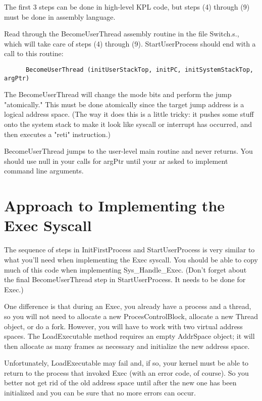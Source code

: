 \documentclass[12pt]{article}
\begin{document}
The first 3 steps can be done in high-level KPL code, but steps (4)
through (9) must be done in assembly language.

Read through the BecomeUserThread assembly routine in the file
Switch.s., which will take care of steps (4) through (9).
StartUserProcess should end with a call to this routine:

\begin{verbatim}
      BecomeUserThread (initUserStackTop, initPC, initSystemStackTop, argPtr)
\end{verbatim}

The BecomeUserThread will change the mode bits and perform the jump
"atomically." This must be done atomically since the target jump
address is a logical address space.  (The way it does this is a little
tricky: it pushes some stuff onto the system stack to make it look
like syscall or interrupt has occurred, and then executes a "reti"
instruction.)

BecomeUserThread jumps to the user-level main routine and never returns.
You should use null in your calls for argPtr until your ar asked to
implement command line arguments.


\section{Approach to Implementing the Exec Syscall}

The sequence of steps in InitFirstProcess and StartUserProcess is very
similar to what you'll need when implementing the Exec syscall.  You
should be able to copy much of this code when implementing
Sys\_Handle\_Exec.  (Don't forget about the final BecomeUserThread
step in StartUserProcess.  It needs to be done for Exec.)

One difference is that during an Exec, you already have a process and
a thread, so you will not need to allocate a new ProcesControlBlock,
allocate a new Thread object, or do a fork.  However, you will have to
work with two virtual address spaces.  The LoadExecutable method
requires an empty AddrSpace object; it will then allocate as many
frames as necessary and initialize the new address space.

Unfortunately, LoadExecutable may fail and, if so, your kernel must be
able to return to the process that invoked Exec (with an error code,
of course).  So you better not get rid of the old address space until
after the new one has been initialized and you can be sure that no
more errors can occur.
\end{document}
